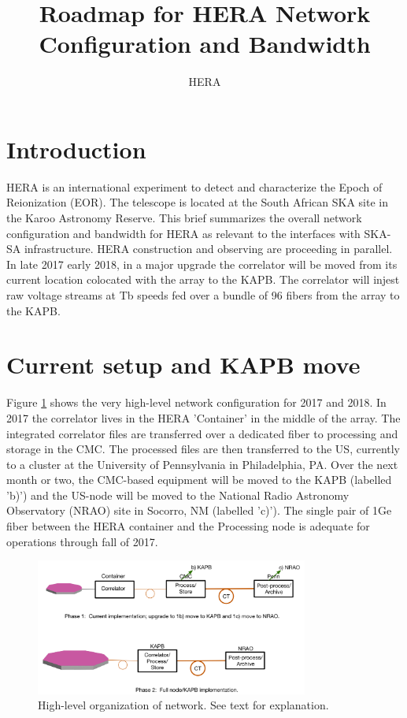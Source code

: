 \documentclass{article}
\begin{document}
\author{HERA}
\title{Roadmap for HERA Network Configuration and Bandwidth}
\maketitle

\section{Introduction}
HERA is an international experiment to detect and characterize the Epoch of Reionization (EOR).  The telescope is located at the South African SKA site in the Karoo
Astronomy Reserve.  This brief summarizes the overall network configuration and bandwidth for HERA as relevant to the interfaces with SKA-SA infrastructure.  HERA construction and observing are proceeding in parallel.  In late 2017 early 2018, in a major upgrade the correlator will be moved from its current location colocated with the array to the KAPB. The correlator will injest raw voltage streams at Tb speeds fed over a bundle of 96 fibers from the array to the KAPB.

\section{Current setup and KAPB move}
Figure \ref{fig:hi_level} shows the very high-level network configuration for 2017 and 2018.  In 2017 the correlator lives in the HERA 'Container' in the middle of the array.  The integrated correlator files are transferred over a dedicated fiber to processing and storage in the CMC.  The processed files are then transferred to the US, currently to a cluster at the University of Pennsylvania in Philadelphia, PA.  Over the next month or two, the CMC-based equipment will be moved to the KAPB (labelled 'b)') and the US-node will be moved to the National Radio Astronomy Observatory (NRAO) site in Socorro, NM (labelled 'c)').  The single pair of 1Ge fiber between the HERA container and the Processing node is adequate for operations through fall of 2017.

\begin{figure}[H]
\includegraphics[width=0.8\textwidth]{network.png}
\centering
\caption{High-level organization of network.  See text for explanation.}
\label{fig:hi_level}
\end{figure}
\end{document}
